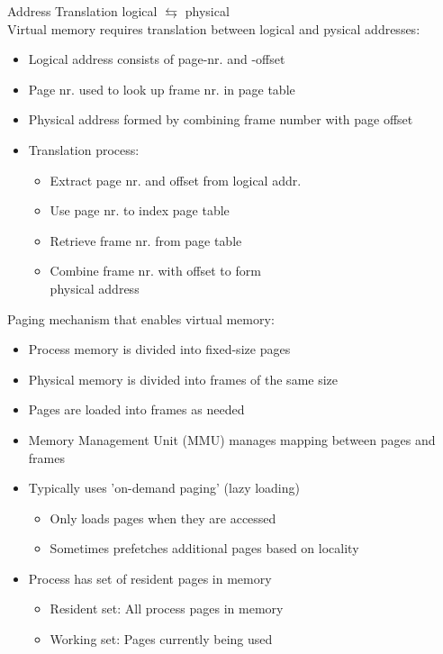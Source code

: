 \begin{concept}{Address Translation} logical $\leftrightarrows$ physical\\
    Virtual memory requires translation between logical and pysical addresses:
    \begin{itemize}
        \item Logical address consists of page-nr. and -offset
        \item Page nr. used to look up frame nr. in page table
        \item Physical address formed by combining frame number with page offset
        \item Translation process:
            \begin{itemize}
                \item Extract page nr. and offset from logical addr.
                \item Use page nr. to index page table
                \item Retrieve frame nr. from page table
                \item Combine frame nr. with offset to form \\ physical address
            \end{itemize}
    \end{itemize}
\end{concept}



\multend

\begin{definition}{Paging} mechanism that enables virtual memory:
    \begin{itemize}
        \item Process memory is divided into fixed-size pages
        \item Physical memory is divided into frames of the same size
        \item Pages are loaded into frames as needed
        \item Memory Management Unit (MMU) manages mapping between pages and frames
        \item Typically uses 'on-demand paging' (lazy loading)
            \begin{itemize}
                \item Only loads pages when they are accessed
                \item Sometimes prefetches additional pages based on locality
            \end{itemize}
        \item Process has set of resident pages in memory
            \begin{itemize}
                \item Resident set: All process pages in memory
                \item Working set: Pages currently being used
            \end{itemize}
    \end{itemize}
\end{definition}

